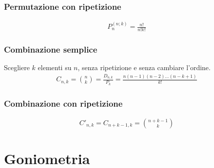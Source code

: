 \documentclass[a4paper]{article}
\begin{document}
	\subsubsection*{Permutazione con ripetizione}
	\begin{align*}
		P_n^{(n;k)}=\frac{n!}{n!k!}
	\end{align*}
	
	\subsubsection*{Combinazione semplice}
	Scegliere $k$ elementi su $n$, senza ripetizione e senza cambiare l'ordine.
	\begin{align*}
		C_{n,k} = {{n}\choose{k}} = \frac{D_{n,k}}{P_k} = \frac{n(n-1)(n-2)...(n-k+1)}{k!} 
	\end{align*}
	
	\subsubsection*{Combinazione con ripetizione}
	\begin{align*}
		C'_{n,k} = C_{n+k-1 , k} = {{n+k-1}\choose{k}}
	\end{align*}
	
	\newpage
	\section{Goniometria}
		
\end{document}

